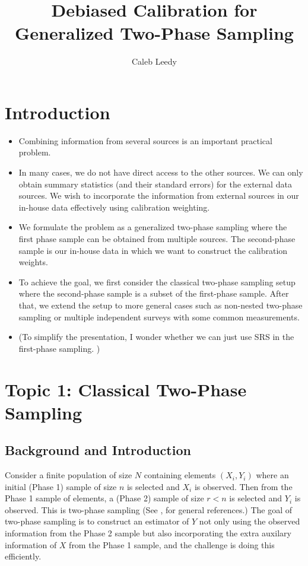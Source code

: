 \documentclass[12pt]{article}
\begin{document}
\title{Debiased Calibration for Generalized Two-Phase Sampling}
\author{Caleb Leedy}
\maketitle 


\section{Introduction}

\begin{itemize}
\item Combining information from several sources is an important practical
  problem. 
\item In many cases, we do not have direct access to the other sources. We can
  only obtain summary statistics (and their standard errors) for the external
  data sources. We wish to incorporate the information from external  sources in
  our in-house data effectively using calibration weighting.  
\item We formulate the problem as a generalized two-phase sampling where the
  first phase sample can be obtained from multiple sources. The second-phase
  sample is our in-house data in which we want to construct the calibration
  weights. 
\item To achieve the goal, we first consider  the  classical two-phase sampling
  setup where the second-phase sample is a subset of the first-phase sample.
  After that, we extend the setup to more general cases such as non-nested
  two-phase sampling or multiple independent surveys with some common
  measurements. 
\item (To simplify the presentation, I wonder whether we can just use SRS in the
  first-phase sampling. ) 
\end{itemize}
\section{Topic 1: Classical Two-Phase Sampling}

\subsection{Background and Introduction}

Consider a finite population of size $N$ containing elements $(X_i, Y_i)$ where
an initial (Phase 1) sample of size $n$ is selected and $X_i$ is observed. Then
from the Phase 1 sample of elements, a (Phase 2) sample of size $r < n$ is
selected and $Y_i$ is observed. This is two-phase sampling (See 
\cite{fuller2009sampling}, \cite{kim2024statistics} for general references.) The
goal of two-phase sampling is to construct an estimator of $Y$ not
only using the observed information from the Phase 2 sample but also
incorporating the extra auxilary information of $X$ from the Phase 1 sample, and
the challenge is doing this efficiently.
\end{document}
